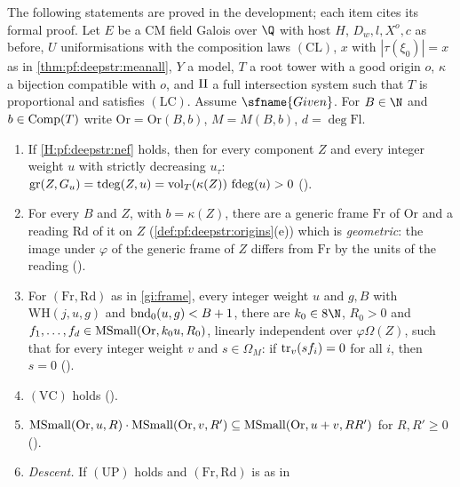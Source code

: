 \begin{proposition}\label{prop:pf:deepstr:geominputs}
The following statements are proved in the development; each item cites its formal proof. Let $E$ be a CM field Galois over $\Q$ with host $H$, $D_w,l,X^o,c$ as before, $U$ uniformisations with
the composition laws $\mathrm{(CL)}$, $x$ with $|\tau(\xi_0)|=x$ as in \cref{thm:pf:deepstr:meanall}, $Y$ a model, $T$ a
root tower with a good origin $o$, $\kappa$ a bijection compatible with $o$, and $\mathrm{II}$ a full intersection
system such that $T$ is proportional and satisfies $\mathrm{(LC)}$. Assume $\sfname{Given}$. For
$B\in\N$ and $b\in\operatorname{Comp}(T)$ write $\mathrm{Or}=\mathrm{Or}(B,b)$, $M=M(B,b)$, $d=\deg\mathrm{Fl}$.
\begin{enumerate}[label=(\alph*)]
\item\label{gi:topdeg} If \ref{H:pf:deepstr:nef} holds, then for every component $Z$ and every integer weight $u$
with strictly decreasing $u_\tau$: $\mathrm{gr}(Z,G_u)=\operatorname{tdeg}(Z,u)=\operatorname{vol}_T(\kappa(Z))\,\operatorname{fdeg}(u)>0$
().
\item\label{gi:frame} For every $B$ and $Z$, with $b=\kappa(Z)$, there are a generic frame $\mathrm{Fr}$ of
$\mathrm{Or}$ and a reading $\mathrm{Rd}$ of it on $Z$ (\cref{def:pf:deepstr:origins}(e)) which is
\emph{geometric}: the image under $\varphi$ of the generic frame of $Z$ differs from $\mathrm{Fr}$ by the units of
the reading ().
\item\label{gi:basis} For $(\mathrm{Fr},\mathrm{Rd})$ as in \ref{gi:frame}, every integer weight $u$ and $g,B$ with
$\mathrm{WH}(j,u,g)$ and $\operatorname{bnd}_0(u,g)<B+1$, there are $k_0\in8\N$, $R_0>0$ and
$f_1,\dots,f_d\in\operatorname{MSmall}(\mathrm{Or},k_0u,R_0)$, linearly independent over $\varphi\Omega(Z)$, such that for every
integer weight $v$ and $s\in\Omega_M$: if $\operatorname{tr}_v(sf_i)=0$ for all $i$, then $s=0$
().
\item\label{gi:htlow} $\mathrm{(VC)}$ holds ().
\item\label{gi:mul} $\operatorname{MSmall}(\mathrm{Or},u,R)\cdot\operatorname{MSmall}(\mathrm{Or},v,R')\subseteq\operatorname{MSmall}(\mathrm{Or},u+v,RR')$ for
$R,R'\ge0$ ().
\item\label{gi:descent} \emph{Descent.} If $\mathrm{(UP)}$ holds and $(\mathrm{Fr},\mathrm{Rd})$ is as in

\end{enumerate}
\end{proposition}
